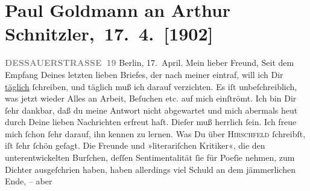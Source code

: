                \section[ Paul Goldmann an Arthur Schnitzler, 17. 4. {[}1902{]}]{ Paul Goldmann an Arthur Schnitzler, 17. 4. {[}1902{]}}\nopagebreak{}\rehead{ }\begin{ledgroupsized}[t]{13cm}\normalsize\beginnumbering \toendnotes[C]{\smallbreak\pagebreak[2]} 
\toendnotes[C]{\smallbreak}\pstart
           \noindent{}\raggedleft{}{\pb}\textcolor{gray}{\textbf{DESSAUERSTRASSE 19}}\pend
           \pstart
           Berlin, 17. April.\pend
           \pstart\center{}Mein lieber Freund,\pend\pstart
           Seit dem Empfang Deines letzten lieben Briefes, der nach meiner \label{K_L03204-1v}\label{K_L03204-1h} eintraf, will ich Dir \uline{täglich} ſchreiben, und
               täglich muß ich darauf verzichten. Es iſt unbeſchreiblich, was jetzt wieder Alles an
               Arbeit, Beſuchen etc. auf mich einſtrömt. Ich bin Dir ſehr dankbar, daß du meine
               Antwort nicht abgewartet und mich abermals heut durch
               Deine lieben Nachrichten erfreut haſt. Dieſer \label{K_L03204-2v}\label{K_L03204-2h} muß herrlich ſein. Ich freue mich ſchon ſehr darauf, ihn kennen zu lernen.
                  {\pb}Was Du über \textsc{Hirschfeld} ſchreibſt, iſt ſehr ſchön geſagt. Die Freunde und »literariſchen Kritiker«, die
               den unterentwickelten Burſchen, deſſen Sentimentalität ſie für Poeſie nehmen, zum Dichter
               ausgeſchrien haben, haben allerdings viel Schuld an dem jämmerlichen Ende, – aber

\end{ledgroupsized}
